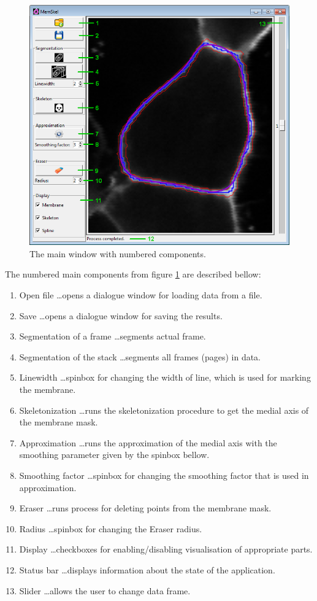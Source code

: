 \begin{figure}[htb]
    \centering
    \includegraphics[width = .7\textwidth]{gui_labeled.png}
    \caption{The main window with numbered components.}
    \label{fig:gui_labeled}
\end{figure}

The numbered main components from figure \ref{fig:gui_labeled} are described bellow:
\begin{enumerate}
    \item Open file \ldots opens a dialogue window for loading data from a file.
	\item Save \ldots opens a dialogue window for saving the results.
	\item Segmentation of a frame \ldots segments actual frame.
	\item Segmentation of the stack \ldots segments all frames (pages) in data.
	\item Linewidth \ldots spinbox for changing the width of line, which is used for marking the membrane.
	\item Skeletonization \ldots runs the skeletonization procedure to get the medial axis of the membrane mask.
	\item Approximation \ldots runs the approximation of the medial axis with the smoothing parameter given by the spinbox bellow.
	\item Smoothing factor \ldots spinbox for changing the smoothing factor that is used in approximation.
	\item Eraser \ldots runs process for deleting points from the membrane mask.
	\item Radius \ldots spinbox for changing the Eraser radius.
	\item Display \ldots checkboxes for enabling/disabling visualisation of appropriate parts.
	\item Status bar \ldots displays information about the state of the application.
	\item Slider \ldots allows the user to change data frame.
\end{enumerate}


